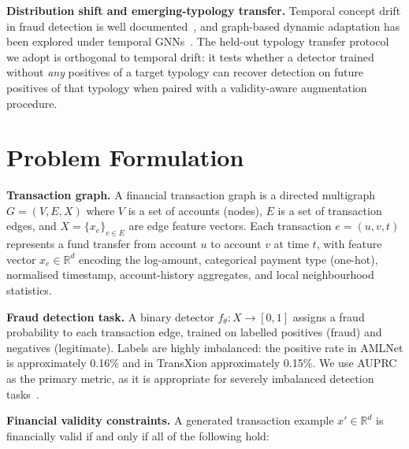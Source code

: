 \documentclass[sigconf,review,anonymous]{acmart}
\begin{document}
\textbf{Distribution shift and emerging-typology transfer.}
Temporal concept drift in fraud detection is well
documented~\cite{dal2015learned,gama2014survey}, and graph-based dynamic
adaptation has been explored under temporal
GNNs~\cite{xu2021consumer,cai2021structural}. The held-out typology transfer
protocol we adopt is orthogonal to temporal drift: it tests whether a
detector trained without \emph{any} positives of a target typology can
recover detection on future positives of that typology when paired with a
validity-aware augmentation procedure.

\section{Problem Formulation}
\label{sec:problem}

\textbf{Transaction graph.}
A financial transaction graph is a directed multigraph $G = (V, E, X)$
where $V$ is a set of accounts (nodes), $E$ is a set of transaction edges,
and $X = \{x_e\}_{e \in E}$ are edge feature vectors. Each transaction
$e = (u, v, t)$ represents a fund transfer from account $u$ to account $v$
at time $t$, with feature vector $x_e \in \mathbb{R}^d$ encoding the
log-amount, categorical payment type (one-hot), normalised timestamp,
account-history aggregates, and local neighbourhood statistics.

\textbf{Fraud detection task.}
A binary detector $f_\theta : X \to [0,1]$ assigns a fraud probability
to each transaction edge, trained on labelled positives (fraud) and
negatives (legitimate). Labels are highly imbalanced: the positive rate
in AMLNet is approximately 0.16\% and in TransXion approximately 0.15\%.
We use AUPRC as the primary metric, as it is appropriate for severely
imbalanced detection tasks~\cite{davis2006relationship}.

\textbf{Financial validity constraints.}
A generated transaction example $x' \in \mathbb{R}^d$ is financially valid
if and only if all of the following hold:
\end{document}
